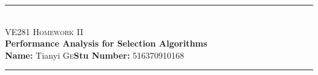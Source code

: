 \newcommand{\HRule}{\rule{\linewidth}{0.5mm}}
{
\center

\HRule \\[0.4cm]
\textsc{\huge VE281 Homework II}\\[0.4cm]
{\Large\textbf{Performance Analysis for Selection Algorithms}}\\[0.4cm]
{\large \textbf{Name:} Tianyi  \textsc{Ge}\quad \textbf{Stu Number:} 516370910168}\\[0.2cm]
\HRule \\[1.5cm]
}